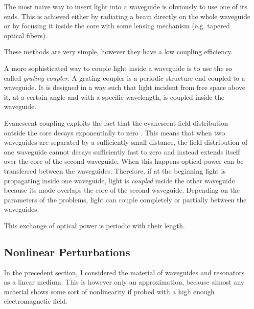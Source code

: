 The most naive way to insert light into a waveguide is obviously to use one of its ends.
This is achieved either by radiating a beam directly on the whole waveguide or by focusing it inside the core with some lensing mechanism (e.g. tapered optical fibers).

These methods are very simple, however they have a low coupling efficiency. %

A more sophisticated way to couple light inside a waveguide is to use the so called \textit{grating coupler}.
A grating coupler is a periodic structure end coupled to a waveguide.
It is designed in a way such that light incident from free space above it, at a certain angle and with a specific wavelength, is coupled inside the waveguide.

Evanescent coupling exploits the fact that the evanescent field distribution outside the core decays exponentially to zero \cite{Reed2004}.
This means that when two waveguides are separated by a sufficiently small distance, the field distribution of one waveguide cannot decays sufficiently fast to zero and instead extends itself over the core of the second waveguide.
When this happens optical power can be transferred between the waveguides.
Therefore, if at the beginning light is propagating inside one waveguide, light is \textit{coupled} inside the other waveguide because its mode overlaps the core of the second waveguide.
Depending on the parameters of the problems, light can couple completely or partially between the waveguides.

This exchange of optical power is periodic with their length.

\subsection{Nonlinear Perturbations}
\label{ssec:Nonlinear_Perturbations}
In the precedent section, I considered the material of waveguides and resonators as a linear medium.
This is however only an approximation, because almost any material shows some sort of nonlinearity if probed with a high enough electromagnetic field.


